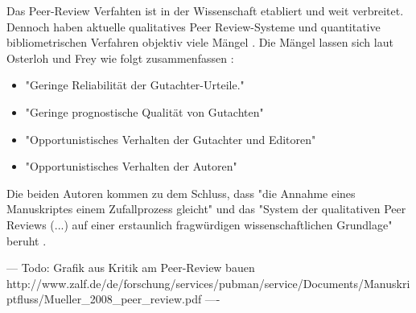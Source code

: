 Das Peer-Review Verfahten ist in der Wissenschaft etabliert und weit verbreitet. Dennoch haben aktuelle qualitatives Peer Review-Systeme und quantitative bibliometrischen Verfahren objektiv viele Mängel \cite{osterloh2008anreize} \cite{Lee_2012} \cite{Jansen_2007}. Die Mängel lassen sich laut Osterloh und Frey wie folgt zusammenfassen \cite{osterloh2008anreize}:
\begin{itemize}
\item "Geringe Reliabilität der Gutachter-Urteile."
\item "Geringe prognostische Qualität von Gutachten"
\item "Opportunistisches Verhalten der Gutachter und Editoren"
\item "Opportunistisches Verhalten der Autoren"
\end{itemize}
Die beiden Autoren kommen zu dem Schluss, dass "die Annahme eines Manuskriptes einem Zufallprozess gleicht"  und das "System der qualitativen Peer Reviews (...) auf einer erstaunlich fragwürdigen wissenschaftlichen Grundlage" beruht \cite{osterloh2008anreize}. 

--- Todo: Grafik aus Kritik am Peer-Review bauen http://www.zalf.de/de/forschung/services/pubman/service/Documents/Manuskriptfluss/Mueller_2008_peer_review.pdf ----

